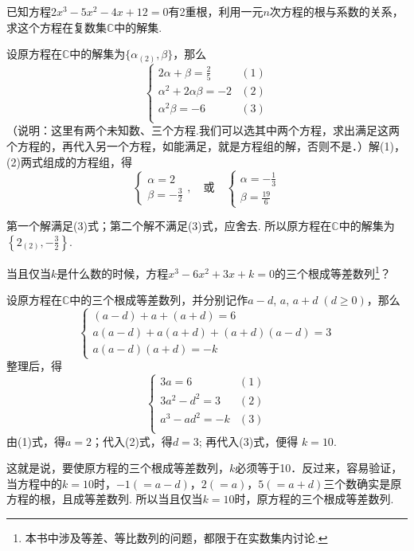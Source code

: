 \begin{example}
    已知方程$2x^3-5x^2-4x+12=0$有2重根，利用一元$n$次方程的根与系数的关系，求这个方程在复数集$\mathbb{C}$中的解集.
\end{example}

\begin{solution}
设原方程在$\mathbb{C}$中的解集为$\{\alpha_{(2)},\beta\}$，那么
\[\begin{cases}
    2\alpha +\beta =\frac{2}{5} & (1)\\
    \alpha^2 +2\alpha \beta =-2 & (2)\\
    \alpha^2 \beta =-6 & (3)\\
\end{cases}\]
（说明：这里有两个未知数、三个方程.我们可以选其中两个方程，求出满足这两个方程的，再代入另一个方程，如能满足，就是方程组的解，否则不是．）解(1)，(2)两式组成的方程组，得
\[\begin{cases}
    \alpha=2\\ \beta =-\frac{3}{2}
\end{cases},\quad \text{或} \quad \begin{cases}
    \alpha=-\frac{1}{3}\\[1ex] \beta=\frac{19}{6}
\end{cases}\]

第一个解满足(3)式；第二个解不满足(3)式，应舍去. 所以原方程在$\mathbb{C}$中的解集为$\left\{2_{(2)},-\frac{3}{2}\right\}$.
\end{solution}

\begin{example}
    当且仅当$k$是什么数的时候，方程$x^3-6x^2+3x+k=0$的三个根成等差数列\footnote{本书中涉及等差、等比数列的问题，都限于在实数集内讨论.}？
\end{example}

\begin{solution}
设原方程在$\mathbb{C}$中的三个根成等差数列，并分别记作$a-d$, $a$, $a+d\; (d\ge 0)$，那么
\[\begin{cases}
    (a-d)+a+(a+d)=6\\
    a(a-d)+a(a+d)+(a+d)(a-d)=3\\
    a(a-d)(a+d)=-k
\end{cases}\]
整理后，得
\[\begin{cases}
    3a=6& (1)\\
    3a^2-d^2=3& (2)\\
    a^3-ad^2=-k & (3)\\
\end{cases}\]
由(1)式，得$a=2$；代入(2)式，得$d=3$; 再代入(3)式，便得
$k=10$.

这就是说，要使原方程的三个根成等差数列，$k$必须等于10．反过来，容易验证，当方程中的$k=10$时，$-1(=a-d)$，$2(=a)$，$5(=a+d)$三个数确实是原方程的根，且成等差数列. 所以当且仅当$k=10$时，原方程的三个根成等差数列.
\end{solution}

